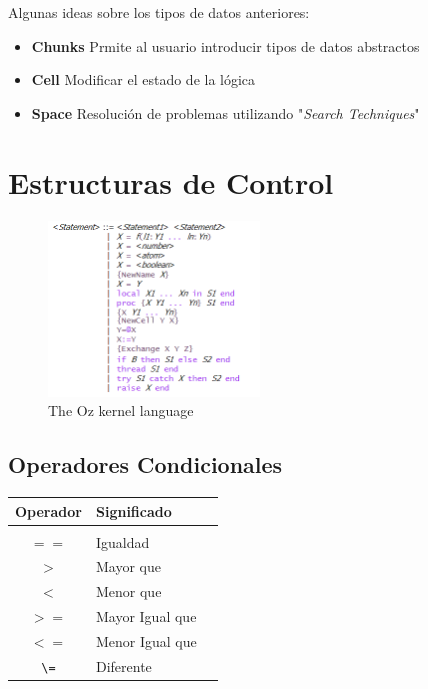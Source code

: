 \documentclass[10pt,journal,compsoc]{IEEEtran}
\begin{document}
Algunas ideas sobre los tipos de datos anteriores:
\begin{itemize}
	\item \textbf{Chunks}
		\subitem Prmite al usuario introducir tipos de datos abstractos
	\item \textbf{Cell}
		\subitem Modificar el estado de la l\'ogica
	\item \textbf{Space}
		\subitem Resoluci\'on de problemas utilizando "\textit{Search Techniques}"
\end{itemize}

\section{Estructuras de Control}
\begin{figure}[h]
	\centering
	\includegraphics[width=0.5\textwidth]{struct.png}
	\caption{The Oz kernel language}
\end{figure}
\subsection{Operadores Condicionales}
\begin{tabular}{c p{3cm} p{5cm}}
	Operador & Significado\\
	\hline\hline\\
	$==$ & Igualdad\\
	$>$ & Mayor que\\
	$<$ & Menor que\\
	$>=$ & Mayor Igual que\\
	$<=$ &Menor Igual que\\
	\verb|\=| & Diferente\\
	\hline
\end{tabular}
\end{document}
